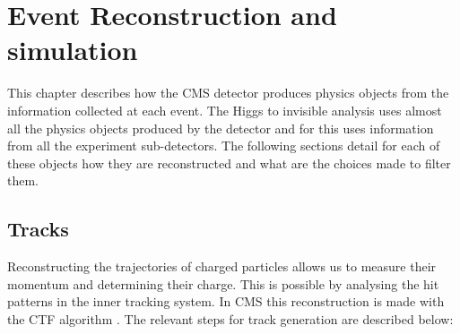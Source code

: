 \chapter{Event Reconstruction and simulation}
\label{CHAPTER:EventReconstructionAndSimulation}

\glsresetall %

This chapter describes how the \gls{CMS} detector produces physics objects from the information collected at each event. The  Higgs to invisible analysis uses almost all the physics objects produced by the detector and for this uses information from all the experiment sub-detectors. The following sections detail for each of these objects how they are reconstructed and what are the choices made to filter them.

\section{Tracks}
\label{SECTION:EventReconstructionAndSimulation_Tracks}


Reconstructing the trajectories of charged particles allows us to measure their momentum and determining their charge. This is possible by analysing the hit patterns in the inner tracking system. In \gls{CMS} this reconstruction is made with the \gls{CTF} algorithm \cite{ARTICLE:CMSTrackReconstruction}. The relevant steps for track generation are described below:

